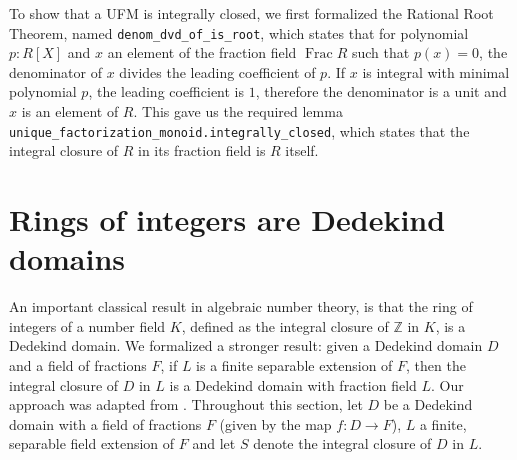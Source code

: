 \documentclass[a4paper,USenglish,cleveref, autoref, thm-restate]{lipics-v2021}
\newcommand{\lean}[1]{\texttt{#1}\xspace} %
\newcommand{\Z}{\mathbb{Z}}
\DeclareMathOperator{\Frac}{Frac}
\begin{document}
To show that a UFM is integrally closed, we first formalized the Rational Root Theorem, named \lean{denom\_dvd\_of\_is\_root},
which states that for polynomial $p : R[X]$ and $x$ an element of the fraction field $\Frac R$ such that $p(x) = 0$, the denominator of $x$ divides the leading coefficient of $p$.
If $x$ is integral with minimal polynomial $p$, the leading coefficient is $1$, therefore the denominator is a unit and $x$ is an element of $R$.
This gave us the required lemma \lean{unique\_factorization\_monoid.integrally\_closed}, which states that the integral closure of $R$ in its fraction field is $R$ itself.

\section{Rings of integers are Dedekind domains} \label{sec:integral-closure}


An important classical result in algebraic number theory, is that the ring of integers of a number field $K$, defined as the integral closure of $\Z$ in $K$, is a Dedekind domain. We formalized a stronger result: given a Dedekind domain $D$ and a field of fractions $F$, if $L$ is a finite separable extension of $F$, then the integral closure of $D$ in $L$ is a Dedekind domain with fraction field $L$.
Our approach was adapted from \cite[Theorem~3.1]{Neukirch}.
Throughout this section, let $D$ be a Dedekind domain with a field of fractions $F$ (given by the map $f \colon D \to F$), $L$ a finite, separable field extension of $F$ and let $S$ denote the integral closure of $D$ in $L$.
\end{document}
